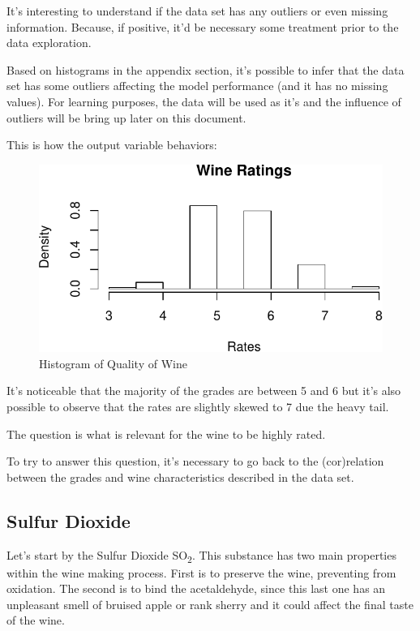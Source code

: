\documentclass[]{article}
\begin{document}
It's interesting to understand if the data set has any outliers or even
missing information. Because, if positive, it'd be necessary some
treatment prior to the data exploration.

Based on histograms in the appendix section, it's possible to infer that
the data set has some outliers affecting the model performance (and it
has no missing values). For learning purposes, the data will be used as
it's and the influence of outliers will be bring up later on this
document.

This is how the output variable behaviors: \newpage

\begin{figure}[htbp]
\centering
\includegraphics{./Project_files/figure-latex/unnamed-chunk-2-1.pdf}
\caption{Histogram of Quality of Wine}
\end{figure}

It's noticeable that the majority of the grades are between 5 and 6 but
it's also possible to observe that the rates are slightly skewed to 7
due the heavy tail.

The question is what is relevant for the wine to be highly rated.

To try to answer this question, it's necessary to go back to the
(cor)relation between the grades and wine characteristics described in
the data set.

\subsection{Sulfur Dioxide}\label{sulfur-dioxide}

Let's start by the Sulfur Dioxide SO\textsubscript{2}. This substance
has two main properties within the wine making process. First is to
preserve the wine, preventing from oxidation. The second is to bind the
acetaldehyde, since this last one has an unpleasant smell of bruised
apple or rank sherry and it could affect the final taste of the wine.
\cite{so2}
\end{document}
